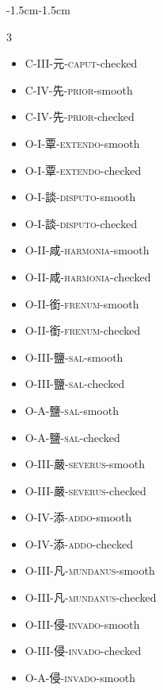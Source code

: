 \begin{adjustwidth}{-1.5cm}{-1.5cm}
\begin{multicols}{3}
\begin{itemize}[label={}, leftmargin=*]
  \item C-III-元-\textsc{caput}-checked \hfill {}
  \item C-IV-先-\textsc{prior}-smooth \hfill {}
  \item C-IV-先-\textsc{prior}-checked \hfill {}
  \item O-I-覃-\textsc{extendo}-smooth \hfill {}

  \item O-I-覃-\textsc{extendo}-checked \hfill {}
  \item O-I-談-\textsc{disputo}-smooth \hfill {}
  \item O-I-談-\textsc{disputo}-checked \hfill {}
  \item O-II-咸-\textsc{harmonia}-smooth \hfill {}

  \item O-II-咸-\textsc{harmonia}-checked \hfill {}
  \item O-II-銜-\textsc{frenum}-smooth \hfill {}
  \item O-II-銜-\textsc{frenum}-checked \hfill {}
  \item O-III-鹽-\textsc{sal}-smooth \hfill {}

  \item O-III-鹽-\textsc{sal}-checked \hfill {}
  \item O-A-鹽-\textsc{sal}-smooth \hfill {}
  \item O-A-鹽-\textsc{sal}-checked \hfill {}
  \item O-III-嚴-\textsc{severus}-smooth \hfill {}

  \item O-III-嚴-\textsc{severus}-checked \hfill {}
  \item O-IV-添-\textsc{addo}-smooth \hfill {}
  \item O-IV-添-\textsc{addo}-checked \hfill {}
  \item O-III-凡-\textsc{mundanus}-smooth \hfill {}

  \item O-III-凡-\textsc{mundanus}-checked \hfill {}
  \item O-III-侵-\textsc{invado}-smooth \hfill {}
  \item O-III-侵-\textsc{invado}-checked \hfill {}
  \item O-A-侵-\textsc{invado}-smooth \hfill {}


\end{itemize}
\end{multicols}
\end{adjustwidth}
